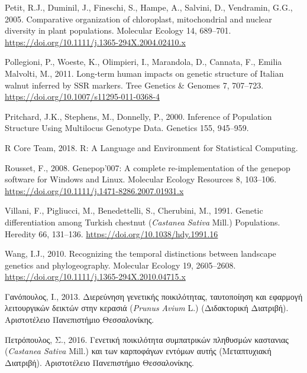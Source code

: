 \documentclass[12pt,a4paper,]{report}
\begin{document}
\leavevmode\hypertarget{ref-Petit2005}{}%
Petit, R.J., Duminil, J., Fineschi, S., Hampe, A., Salvini, D.,
Vendramin, G.G., 2005. Comparative organization of chloroplast,
mitochondrial and nuclear diversity in plant populations. Molecular
Ecology 14, 689--701.
\url{https://doi.org/10.1111/j.1365-294X.2004.02410.x}

\leavevmode\hypertarget{ref-Pollegioni2011}{}%
Pollegioni, P., Woeste, K., Olimpieri, I., Marandola, D., Cannata, F.,
Emilia Malvolti, M., 2011. Long-term human impacts on genetic structure
of Italian walnut inferred by SSR markers. Tree Genetics \& Genomes 7,
707--723. \url{https://doi.org/10.1007/s11295-011-0368-4}

\leavevmode\hypertarget{ref-pritchard_inference_2000}{}%
Pritchard, J.K., Stephens, M., Donnelly, P., 2000. Inference of
Population Structure Using Multilocus Genotype Data. Genetics 155,
945--959.

\leavevmode\hypertarget{ref-RCoreTeam2018}{}%
R Core Team, 2018. R: A Language and Environment for Statistical
Computing.

\leavevmode\hypertarget{ref-Rousset2008}{}%
Rousset, F., 2008. Genepop'007: A complete re-implementation of the
genepop software for Windows and Linux. Molecular Ecology Resources 8,
103--106. \url{https://doi.org/10.1111/j.1471-8286.2007.01931.x}

\leavevmode\hypertarget{ref-Villani1991}{}%
Villani, F., Pigliucci, M., Benedettelli, S., Cherubini, M., 1991.
Genetic differentiation among Turkish chestnut (\emph{Castanea}
\emph{Sativa} Mill.) Populations. Heredity 66, 131--136.
\url{https://doi.org/10.1038/hdy.1991.16}

\leavevmode\hypertarget{ref-Wang2010a}{}%
Wang, I.J., 2010. Recognizing the temporal distinctions between
landscape genetics and phylogeography. Molecular Ecology 19, 2605--2608.
\url{https://doi.org/10.1111/j.1365-294X.2010.04715.x}

\leavevmode\hypertarget{ref-__2013}{}%
Γανόπουλος, Ι., 2013. Διερεύνηση γενετικής ποικιλότητας, ταυτοποίηση και
εφαρμογή λειτουργικών δεικτών στην κερασιά (\emph{Prunus} \emph{Avium}
L.) (Διδακτορική Διατριβή). Αριστοτέλειο Πανεπιστήμιο Θεσσαλονίκης.

\leavevmode\hypertarget{ref-2016a}{}%
Πετρόπουλος, Σ., 2016. Γενετική ποικιλότητα συμπατρικών πληθυσμών
καστανιας (\emph{Castanea Sativa} Mill.) και των καρποφάγων εντόμων
αυτής (Mεταπτυχιακή Διατριβή). Αριστοτέλειο Πανεπιστήμιο Θεσσαλονίκης.
\end{document}
